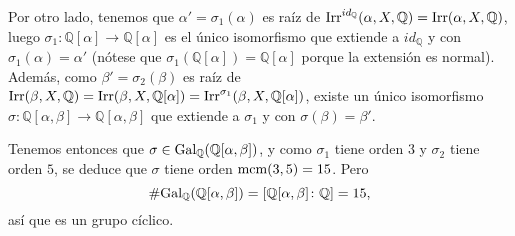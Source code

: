 \documentclass[11pt]{report}
\makeatletter
\renewenvironment{proof}[1][\proofname]{\par
  \pushQED{\qed}%
  \normalfont \topsep\z@skip %
  \trivlist
  \item[\hskip\labelsep
        \itshape
    #1\@addpunct{.}]\ignorespaces
}{%
  \popQED\endtrivlist\@endpefalse
}
\newcommand{\Q}{\mathbb Q}
\makeatother
\begin{document}
\begin{proof}
Por otro lado, tenemos que $\alpha'=\sigma_1(\alpha)$ es raíz de $\textup{Irr}^{id_\Q}(\alpha,X,\Q) = \textup{Irr}(\alpha,X,\Q)$, luego $\sigma_1 \colon \Q[\alpha] \to \Q[\alpha]$ es el único isomorfismo que extiende a $id_\Q$ y con $\sigma_1(\alpha)=\alpha'$ (nótese que $\sigma_1(\Q[\alpha]) =\Q[\alpha]$ porque la extensión es normal). Además, como $\beta' = \sigma_2(\beta)$ es raíz de $\textup{Irr}(\beta,X,\Q) = \textup{Irr}(\beta,X,\Q[\alpha]) = \textup{Irr}^{\sigma_1}(\beta,X,\Q[\alpha]) $, existe un único isomorfismo $\sigma \colon \Q[\alpha,\beta] \to \Q[\alpha,\beta]$ que extiende a $\sigma_1$ y con $\sigma(\beta) = \beta'$.

\begin{center}
\end{center}

Tenemos entonces que $\sigma \in \textup{Gal}_\Q(\Q[\alpha,\beta])$, y como $\sigma_1$ tiene orden $3$ y $\sigma_2$ tiene orden $5$, se deduce que $\sigma$ tiene orden $\textup{mcm}(3,5) = 15$. Pero \[\#\textup{Gal}_\Q(\Q[\alpha,\beta]) = [\Q[\alpha,\beta] \colon \Q] = 15,\] así que es un grupo cíclico.
\end{proof}
\end{document}

